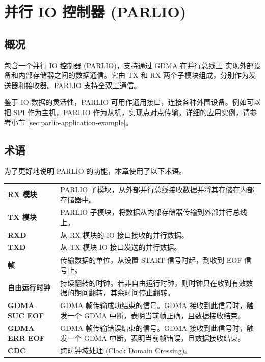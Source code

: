 \documentclass[main\_\_CN.tex]{subfiles}
\begin{document}

\ifglobal
\else
    {\let\clearpage\relax \listoftodos}
    {\let\clearpage\relax \listofdonetodos}
    \tableofcontents
\fi



\hypertarget{parlio}{}
\chapter{并行 IO 控制器 (PARLIO)}
\label{mod:parlio}


\section{概况}

\chipname{} 包含一个并行 IO 控制器 (PARLIO)，支持通过 GDMA 在并行总线上 实现外部设备和内部存储器之间的数据通信。它由 TX 和 RX 两个子模块组成，分别作为发送器和接收器。PARLIO 支持全双工通信。

鉴于 IO 数据的灵活性，PARLIO 可用作通用接口，连接各种外围设备。例如可以把 SPI 作为主机，PARLIO 作为从机，实现点对点传输。详细的应用实例，请参考小节 \ref{sec:parlio-application-example}。

\section{术语}
为了更好地说明 PARLIO 的功能，本章使用了以下术语。

\begin{longtable}[c]{ R{4cm} p{10cm} }

\textbf{RX 模块}      & PARLIO 子模块，从外部并行总线接收数据并将其存储在内部存储器中。 \\
\textbf{TX 模块}      & PARLIO 子模块，将数据从内部存储器传输到外部并行总线上。 \\
\textbf{RXD}          & 从 RX 模块的 IO 接口接收的并行数据。 \\
\textbf{TXD}          & 从 TX 模块 IO 接口发送的并行数据。  \\
\textbf{帧}           & 传输数据的单位，从设置 START 信号时起，到收到 EOF 信号止。 \\
\textbf{自由运行时钟} & 持续翻转的时钟。若非自由运行时钟，则时钟只在收到有效数据的期间翻转，其余时间停止翻转。\\
\textbf{GDMA SUC EOF} & GDMA 帧传输成功结束的信号。GDMA 接收到此信号时，触发一个 GDMA 中断，表明当前帧正确，且数据接收结束。 \\
\textbf{GDMA ERR EOF} & GDMA 帧传输错误结束的信号。GDMA 接收到此信号时，触发一个 GDMA 中断，表明当前帧错误，且数据接收结束。 \\
\textbf{CDC}          & 跨时钟域处理 (Clock Domain Crossing)。 \\

\end{longtable}
\end{document}
